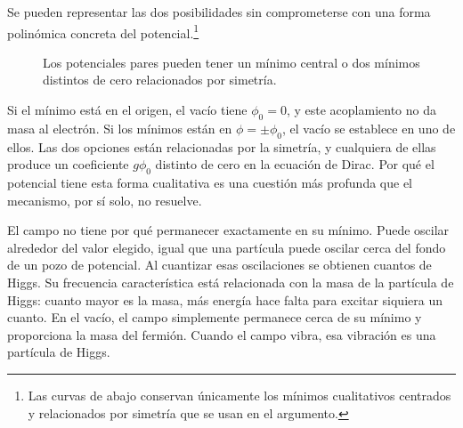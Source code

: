Se pueden representar las dos posibilidades sin comprometerse con una forma polinómica concreta del potencial.\footnote{Las curvas de abajo conservan únicamente los mínimos cualitativos centrados y relacionados por simetría que se usan en el argumento.}
\begin{figure}[htbp]
\centering
{}
\caption{Los potenciales pares pueden tener un mínimo central o dos mínimos distintos de cero relacionados por simetría.}
\end{figure}

Si el mínimo está en el origen, el vacío tiene \(\phi_0=0\), y este acoplamiento no da masa al electrón. Si los mínimos están en \(\phi=\pm\phi_0\), el vacío se establece en uno de ellos. Las dos opciones están relacionadas por la simetría, y cualquiera de ellas produce un coeficiente \(g\phi_0\) distinto de cero en la ecuación de Dirac. Por qué el potencial tiene esta forma cualitativa es una cuestión más profunda que el mecanismo, por sí solo, no resuelve.

El campo no tiene por qué permanecer exactamente en su mínimo. Puede oscilar alrededor del valor elegido, igual que una partícula puede oscilar cerca del fondo de un pozo de potencial. Al cuantizar esas oscilaciones se obtienen cuantos de Higgs. Su frecuencia característica está relacionada con la masa de la partícula de Higgs: cuanto mayor es la masa, más energía hace falta para excitar siquiera un cuanto. En el vacío, el campo simplemente permanece cerca de su mínimo y proporciona la masa del fermión. Cuando el campo vibra, esa vibración es una partícula de Higgs.

